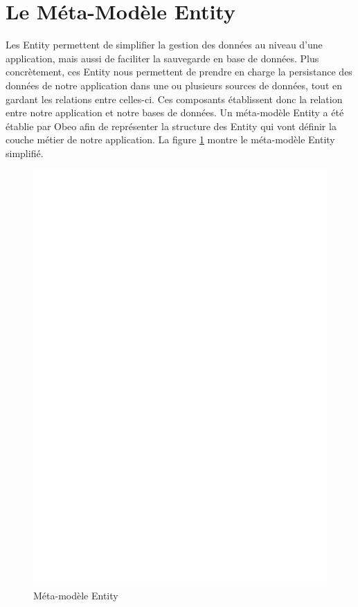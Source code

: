 \section{Le Méta-Modèle Entity}\label{sub:ent}
Les Entity permettent de simplifier la gestion des données au niveau d'une application, mais aussi de faciliter la sauvegarde en base de données. Plus concrètement, ces Entity nous permettent de prendre en charge la persistance des données de notre application dans une ou plusieurs sources de données, tout en gardant les relations entre celles-ci. Ces composants établissent donc la relation entre notre application et notre bases de données.
Un méta-modèle Entity a été établie par Obeo afin de représenter la structure des Entity qui vont définir la couche métier de notre application. La figure \ref{fig:ent}  montre le méta-modèle Entity simplifié.

\begin{figure}[htb]
  \centering
  \includegraphics[scale=.4]{img/Entity.eps}
  \caption{Méta-modèle Entity}
  \label{fig:ent}
\end{figure}


